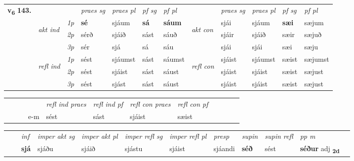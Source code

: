 \begin{tabular}{llllllllllll} \toprule
\multirow{4}{*}{{{\textbf{v{\textsubscript{6}}} \Large{\textbf{143.}}}}}  & &   &  \textit{praes sg}  & \textit{praes pl}  &\textit{ pf sg} & \textit{pf pl} &  &  \textit{praes sg}  & \textit{praes pl}  & \textit{pf sg} & \textit{pf pl } \\*
	\cmidrule{4-7} \cmidrule{9-12}
 & \multirow{3}{*}{\begin{turn}{90}\textit{akt ind}\end{turn}} & {\textit{1p}} & \textbf{sé} & sjáum    & \textbf{sá} & \textbf{sáum} & \multirow{3}{*}{\begin{turn}{90}\textit{akt con}\end{turn}} &sjái & sjáum & \textbf{sæi} & sæjum\\*
& &  {\textit{2p}} &  sérð  & sjáið   & sást & sáuð & & sjáir & sjáið & sæir & sæjuð \\*
& &  {\textit{3p}} & sér & sjá   & sá & sáu & & sjái & sjái& sæi & sæju  \\*
\cmidrule{4-7} \cmidrule{9-12}
 &\multirow{3}{*}{\begin{turn}{90}\textit{refl ind}\end{turn}} & {\textit{1p}} & sést & sjáumst    & sást & sáumst & \multirow{3}{*}{\begin{turn}{90}\textit{refl con}\end{turn}}  &sjáist & sjáumst & sæist & sæjumst\\*
 &&  {\textit{2p}} &  sést  & sjáist   & sást & sáust & &sjáist & sjáist & sæist & sæjust \\*
& &  {\textit{3p}} & sést & sjást   & sást & sáust & & sjáist & sjáist& sæist & sæjust  \\*
\cmidrule{4-7} \cmidrule{9-12}
\end{tabular}


\begin{tabular}{llllllllllll}
 & &  & &  \textit{refl ind praes} & \textit{refl ind pf} & \textit{refl con praes} & \textit{refl con pf} \\*
&  & & e-m & sést & sást & sjáist & sæist \\*
\cmidrule{5-9}
\end{tabular}


\begin{tabular}{llllllllllll}
 & & \textit{inf} & \textit{imper akt sg} & \textit{imper akt pl} & \textit{imper refl sg} & \textit{imper refl pl} & \textit{presp} & \textit{supin} & \textit{supin refl} & \textit{pp m}     \\*
  & & \textbf{sjá} & sjáðu  & sjáið & sjástu & sjáist & sjáandi &  \textbf{séð} & sést & \textbf{séður} adj \textbf{\textsubscript{2d}} \\*
\cmidrule{1-12}
\end{tabular}



